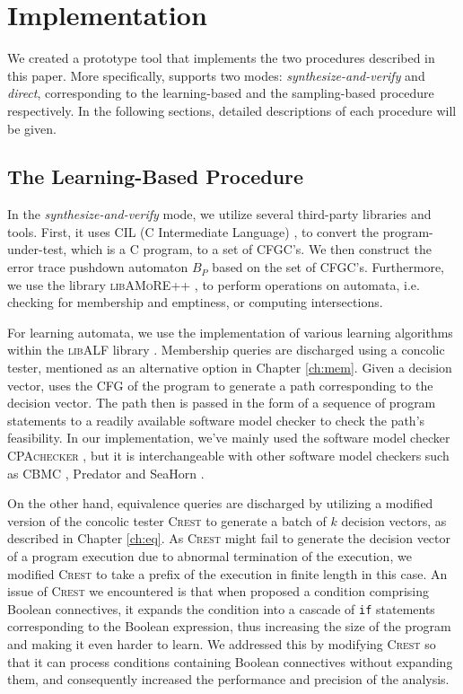 \chapter{Implementation}\label{ch:implementation}

We created a prototype tool \PACMAN that implements the two procedures described in this paper. More specifically, \PACMAN supports two modes: \emph{synthesize-and-verify} and \emph{direct}, corresponding to the learning-based and the sampling-based procedure respectively. In the following sections, detailed descriptions of each procedure will be given.

\section{The Learning-Based Procedure}\label{sec:impl_learning}

In the \emph{synthesize-and-verify} mode, we utilize several third-party libraries and tools. First, it uses CIL (C Intermediate Language) \cite{NeculaMRW02}, \cite{cil} to convert the program-under-test, which is a C program, to a set of CFGC's. We then construct the error trace pushdown automaton $B_P$ based on the set of CFGC's. Furthermore, we use the library \textsc{libAMoRE++} \cite{MatzMPTV95}, \cite{BolligKKLNP10} to perform operations on automata, i.e. checking for membership and emptiness, or computing intersections. 

For learning automata, we use the implementation of various learning algorithms within the \textsc{libALF} library \cite{BolligKKLNP10}. Membership queries are discharged using a concolic tester, mentioned as an alternative option in Chapter \ref{ch:mem}. Given a decision vector, \PACMAN uses the CFG of the program to generate a path corresponding to the decision vector. The path then is passed in the form of a sequence of program statements to a readily available software model checker to check the path's feasibility. In our implementation, we've mainly used the software model checker \textsc{CPAchecker} \cite{BeyerK11}, but it is interchangeable with other software model checkers such as CBMC \cite{ClarkeKL04}, Predator \cite{DudkaPV11} and SeaHorn \cite{GurfinkelKKN15}.

On the other hand, equivalence queries are discharged by utilizing a modified version of the concolic tester \textsc{Crest} \cite{BurnimS08} to generate a batch of $k$ decision vectors, as described in Chapter \ref{ch:eq}. As \textsc{Crest} might fail to generate the decision vector of a program execution due to abnormal termination of the execution, we modified \textsc{Crest} to take a prefix of the execution in finite length in this case. An issue of \textsc{Crest} we encountered is that when proposed a condition comprising Boolean connectives, it expands the condition into a cascade of \texttt{if} statements corresponding to the Boolean expression, thus increasing the size of the program and making it even harder to learn. We addressed this by modifying \textsc{Crest} so that it can process conditions containing Boolean connectives without expanding them, and consequently increased the performance and precision of the analysis. 


